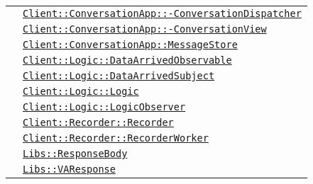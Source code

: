 \begin{longtable}{|>{\centering}m{3cm}|m{10cm}<{\centering}|}
& \hyperref[Client::ConversationApp::ConversationDispatcher]{\texttt{Client::ConversationApp::-\linebreak ConversationDispatcher}}\\
& \hyperref[Client::ConversationApp::ConversationView]{\texttt{Client::ConversationApp::-\linebreak ConversationView}}\\
& \hyperref[Client::ConversationApp::MessageStore]{\texttt{Client::ConversationApp::MessageStore}}\\
& \hyperref[Client::Logic::DataArrivedObservable]{\texttt{Client::Logic::DataArrivedObservable}}\\
& \hyperref[Client::Logic::DataArrivedSubject]{\texttt{Client::Logic::DataArrivedSubject}}\\
& \hyperref[Client::Logic::Logic]{\texttt{Client::Logic::Logic}}\\
& \hyperref[Client::Logic::LogicObserver]{\texttt{Client::Logic::LogicObserver}}\\
& \hyperref[Client::Recorder::Recorder]{\texttt{Client::Recorder::Recorder}}\\
& \hyperref[Client::Recorder::RecorderWorker]{\texttt{Client::Recorder::RecorderWorker}}\\
& \hyperref[Libs::ResponseBody]{\texttt{Libs::ResponseBody}}\\
& \hyperref[Libs::VAResponse]{\texttt{Libs::VAResponse}}\\ \hline


\end{longtable}
